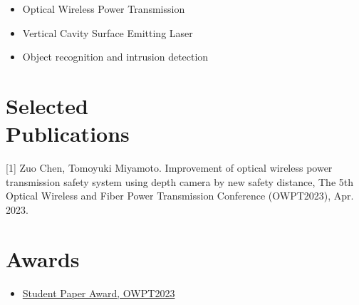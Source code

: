 \documentclass{mycv}
\begin{document}
\begin{itemize}
  \item Optical Wireless Power Transmission
  \item Vertical Cavity Surface Emitting Laser
  \item Object recognition and intrusion detection
\end{itemize}

\section{Selected \\ Publications}%

[1] Zuo Chen, Tomoyuki Miyamoto. Improvement of optical wireless power transmission safety system using depth camera by new safety distance, The 5th Optical Wireless and Fiber Power Transmission Conference (OWPT2023), Apr. 2023.





\section{Awards}

\begin{itemize}
  \item \href{https://www.first.iir.titech.ac.jp/news/2023/detail_1455.html}{Student Paper Award, OWPT2023}
\end{itemize}
\end{document}

